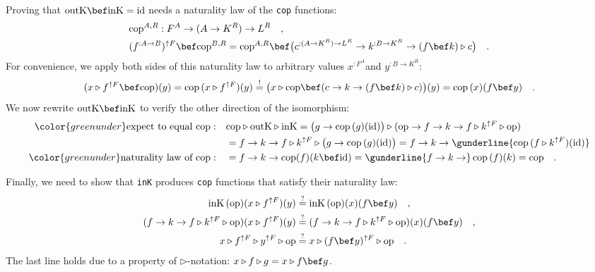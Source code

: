Proving that $\text{outK}\bef\text{inK}=\text{id}$ needs a naturality
law of the \lstinline!cop! functions:
\begin{align*}
 & \text{cop}^{A,R}:F^{A}\rightarrow(A\rightarrow K^{R})\rightarrow L^{R}\quad,\\
 & (f^{:A\rightarrow B})^{\uparrow F}\bef\text{cop}^{B,R}=\text{cop}^{A,R}\bef\big(c^{:(A\rightarrow K^{R})\rightarrow L^{R}}\rightarrow k^{:B\rightarrow K^{R}}\rightarrow(f\bef k)\triangleright c\big)\quad.
\end{align*}
For convenience, we apply both sides of this naturality law to arbitrary
values $x^{:F^{A}}$and $y^{:B\rightarrow K^{R}}$:
\begin{equation}
(x\triangleright f^{\uparrow F}\bef\text{cop})(y)=\text{cop}\,(x\triangleright f^{\uparrow F})(y)\overset{!}{=}\big(x\triangleright\text{cop}\bef(c\rightarrow k\rightarrow(f\bef k)\triangleright c)\big)(y)=\text{cop}\,(x)(f\bef y)\quad.\label{eq:monatron-naturality-law-of-cop}
\end{equation}
We now rewrite $\text{outK}\bef\text{inK}$ to verify the other direction
of the isomorphism:
\begin{align*}
{\color{greenunder}\text{expect to equal }\text{cop}:}\quad & \text{cop}\triangleright\text{outK}\triangleright\text{inK}=\big(g\rightarrow\text{cop}\,(g)(\text{id})\big)\triangleright(\text{op}\rightarrow f\rightarrow k\rightarrow f\triangleright k^{\uparrow F}\triangleright\text{op})\\
 & =f\rightarrow k\rightarrow f\triangleright k^{\uparrow F}\triangleright\big(g\rightarrow\text{cop}\,(g)(\text{id})\big)=f\rightarrow k\rightarrow\gunderline{\text{cop}\,(f\triangleright k^{\uparrow F})(\text{id})}\\
{\color{greenunder}\text{naturality law of }\text{cop}:}\quad & =f\rightarrow k\rightarrow\text{cop}(f)(k\bef\text{id})=\gunderline{f\rightarrow k\rightarrow}\,\text{cop}\,(f)(k)=\text{cop}\quad.
\end{align*}

Finally, we need to show that \lstinline!inK! produces \lstinline!cop!
functions that satisfy their naturality law:
\begin{align*}
\text{inK}\,(\text{op})(x\triangleright f^{\uparrow F})(y) & \overset{?}{=}\text{inK}\,(\text{op})(x)(f\bef y)\quad,\\
(f\rightarrow k\rightarrow f\triangleright k^{\uparrow F}\triangleright\text{op})(x\triangleright f^{\uparrow F})(y) & \overset{?}{=}(f\rightarrow k\rightarrow f\triangleright k^{\uparrow F}\triangleright\text{op})(x)(f\bef y)\quad,\\
x\triangleright f^{\uparrow F}\triangleright y^{\uparrow F}\triangleright\text{op} & \overset{?}{=}x\triangleright(f\bef y)^{\uparrow F}\triangleright\text{op}\quad.
\end{align*}
The last line holds due to a property of $\triangleright$-notation:
$x\triangleright f\triangleright g=x\triangleright f\bef g$.

